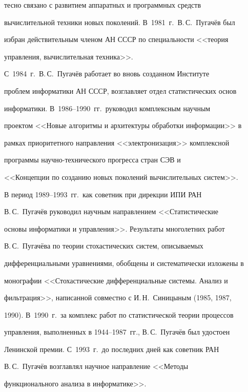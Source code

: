 тесно связано с развитием аппаратных и программных средств 


вычислительной техники новых поколений. В~1981~г.\ В.\,С.~Пугачёв был 


избран действительным членом АН СССР по специальности <<теория 


управления, вычислительная техника>>.


     


     С~1984~г.\ В.\,С.~Пугачёв работает во вновь созданном Институте 


проблем информатики АН СССР, возглавляет отдел статистических основ 


информатики. В~1986--1990~гг.\ руководил комплексным научным 


проектом <<Новые алгоритмы и архитектуры обработки информации>> в 


рамках приоритетного направления <<электронизация>> комплексной 


программы на\-уч\-но-тех\-ни\-че\-ско\-го прогресса стран СЭВ и 


<<Концепции по созданию новых поколений вычислительных систем>>.


     


     В период 1989--1993~гг.\ как советник при дирекции ИПИ РАН 


В.\,С.~Пугачёв руководил научным направлением <<Статистические 


основы информатики и управления>>. Результаты многолетних работ 


В.\,С.~Пугачёва по теории стохастических систем, описываемых 


дифференциальными уравнениями, обобщены и систематически изложены в 


монографии <<Стохастические дифференциальные системы. Анализ и 


фильтрация>>, написанной совместно с И.\,Н.~Синицыным (1985, 1987, 


1990). В~1990~г.\ за комплекс работ по статистической теории процессов 


управления, выполненных в 1944--1987~гг., В.\,С.~Пугачёв был удостоен 


Ленинской премии. С~1993~г.\  до последних дней как советник РАН 


В.\,С.~Пугачёв возглавлял научное направление <<Методы 


функционального анализа в информатике>>.


